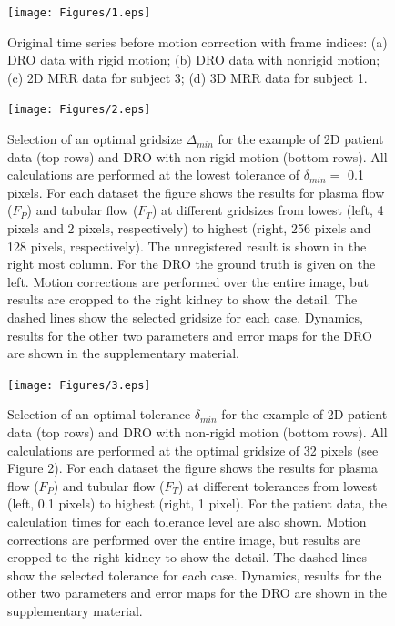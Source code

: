 \documentclass[num-refs]{wiley-article}
\begin{document}
\begin{figure}[tb!]
	\begin{center}
		\texttt{[image: Figures/1.eps]}
		\caption{ Original time series before motion correction with frame indices: (a) DRO data with rigid motion; (b) DRO data with nonrigid motion; (c) 2D MRR data for subject 3; (d) 3D MRR data for subject 1.}
	\end{center}
	
\end{figure}
\begin{figure}[tb!]
	\begin{center}
		\texttt{[image: Figures/2.eps]}
		\caption{ Selection of an optimal gridsize $\Delta_{min}$ for the example of 2D patient data (top rows) and DRO with non-rigid motion (bottom rows). All calculations are performed at the lowest tolerance of $\delta_{min}=$ 0.1 pixels. For each dataset the figure shows the results for plasma flow ($F_P$) and tubular flow ($F_T$) at different gridsizes from lowest (left, 4 pixels and 2 pixels, respectively) to highest (right, 256 pixels and 128 pixels, respectively). The unregistered result is shown in the right most column. For the DRO the ground truth is given on the left. Motion corrections are performed over the entire image, but results are cropped to the right kidney to show the detail. The dashed lines show the selected gridsize for each case. Dynamics, results for the other two parameters and error maps for the DRO are shown in the supplementary material.}
	\end{center}
\end{figure}

\begin{figure}[tb!]
	\begin{center}
		\texttt{[image: Figures/3.eps]}
		\caption{ Selection of an optimal tolerance $\delta_{min}$ for the example of 2D patient data (top rows) and DRO with non-rigid motion (bottom rows). All calculations are performed at the optimal gridsize of 32 pixels (see Figure 2). For each dataset the figure shows the results for plasma flow ($F_P$) and tubular flow ($F_T$) at different tolerances from lowest (left, 0.1 pixels) to highest (right, 1 pixel). For the patient data, the calculation times for each tolerance level are also shown. Motion corrections are performed over the entire image, but results are cropped to the right kidney to show the detail. The dashed lines show the selected tolerance for each case. Dynamics, results for the other two parameters and error maps for the DRO are shown in the supplementary material.}
	\end{center}
\end{figure}
\end{document}
